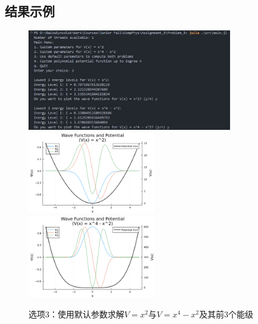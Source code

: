 \subsection{结果示例}
\label{sec:problem_3_example}
\begin{figure}[H]
	\centering
	\includegraphics[width=0.8\textwidth]{Problem_3/figs/choice_3.png}
    \hspace{5pt}
    \includegraphics[width=0.5\textwidth]{Problem_3/figs/plot_1.png}
    \hspace{5pt}
    \includegraphics[width=0.5\textwidth]{Problem_3/figs/plot_2.png}
	\caption{选项3：使用默认参数求解$V=x^2$与$V=x^4-x^2$及其前$3$个能级}
\end{figure}


